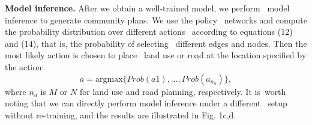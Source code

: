 \textbf{Model inference.} After we obtain a well-trained model, we perform \
model inference to generate community plans. We use the policy \
networks and compute the probability distribution over different actions \
according to equations (12) and (14), that is, the probability of selecting \
different edges and nodes. Then the most likely action is chosen to place \
land use or road at the location specified by the action:
\begin{equation}
    a = \text{argmax}\{Prob(a1),\dots,Prob(a_{n_{a}})\},\label{action}
\end{equation}
where $n_{a}$ is $M$ or $N$ for land use and road planning, respectively. It is\ 
worth noting that we can directly perform model inference under a different \
setup without re-training, and the results are illustrated in Fig. 1c,d.

